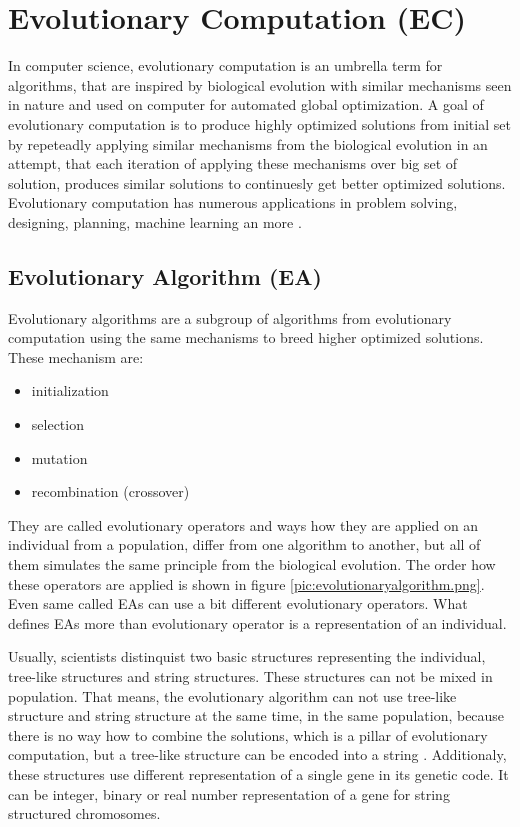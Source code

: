 \chapter{Evolutionary Computation (EC)}
In computer science, evolutionary computation is an umbrella term for algorithms, that are inspired by biological evolution with similar mechanisms seen in nature and used on computer for automated global optimization. A goal of evolutionary computation is to produce highly optimized solutions from initial set by repeteadly applying similar mechanisms from the biological evolution in an attempt, that each iteration of applying these mechanisms over big set of solution, produces similar solutions to continuesly get better optimized solutions. Evolutionary computation has numerous applications in problem solving, designing, planning, machine learning an more \cite{handbook-of-evolutionary-computation}.

\section{Evolutionary Algorithm (EA)}
Evolutionary algorithms are a subgroup of algorithms from evolutionary computation using the same mechanisms to breed higher optimized solutions. These mechanism are:
\begin{itemize}
  \item initialization
  \item selection
  \item mutation
  \item recombination (crossover)
\end{itemize}

They are called evolutionary operators \cite{evolutionary-operators} and ways how they are applied on an individual from a population, differ from one algorithm to another, but all of them simulates the same principle from the biological evolution. The order how these operators are applied is shown in figure \ref{pic:evolutionaryalgorithm.png}. Even same called EAs can use a bit different evolutionary operators. What defines EAs more than evolutionary operator is a representation of an individual.

Usually, scientists distinquist two basic structures representing the individual, tree-like structures and string structures. These structures can not be mixed in population. That means, the evolutionary algorithm can not use tree-like structure and string structure at the same time, in the same population, because there is no way how to combine the solutions, which is a pillar of evolutionary computation, but a tree-like structure can be encoded into a string \cite{gene-expression}. Additionaly, these structures use different representation of a single gene in its genetic code. It can be integer, binary or real number representation of a gene for string structured chromosomes.


